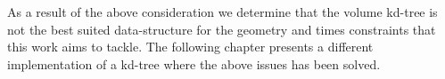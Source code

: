 As a result of the above consideration we determine that the volume kd-tree is not the best suited data-structure for the geometry and times constraints that this work aims to tackle. The following chapter presents a different implementation of a kd-tree where the above issues has been solved.\\



